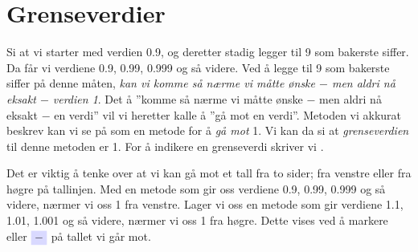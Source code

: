 




\section{Grenseverdier}
Si at vi starter med verdien 0.9, og deretter stadig legger til 9 som bakerste siffer. Da får vi verdiene 0.9, 0.99, 0.999 og så videre. Ved å legge til 9 som bakerste siffer på denne måten, \textsl{kan vi komme så nærme vi måtte ønske $ - $ men aldri nå eksakt $ - $ verdien 1}. Det å ''komme så nærme vi måtte ønske $ - $ men aldri nå eksakt $ - $ en verdi'' vil vi heretter kalle å ''gå mot en verdi''. Metoden vi akkurat beskrev kan vi se på som en metode for å \textsl{gå mot} 1. Vi kan da si at \textit{grenseverdien} til denne metoden er 1. 
For å indikere en grenseverdi skriver vi \sym{$ \lim $}.\vsk

Det er viktig å tenke over at vi kan gå mot et tall fra to sider; fra venstre eller fra høgre på tallinjen. Med en metode som gir oss verdiene 0.9, 0.99, 0.999 og så videre, nærmer vi oss 1 fra venstre. Lager vi oss en metode som gir verdiene 1.1, 1.01, 1.001 og så videre, nærmer vi oss 1 fra høgre. Dette vises ved å markere \sym{$ + $} eller $ \sym{$ - $} $ på tallet vi går mot. 

\regv

\regv

\regv

\regv

